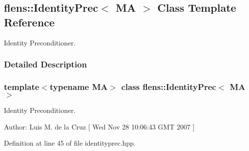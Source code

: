 \hypertarget{classflens_1_1IdentityPrec}{
\subsection{flens::IdentityPrec$<$ MA $>$ Class Template Reference}
\label{classflens_1_1IdentityPrec}
}
Identity Preconditioner.  




\subsubsection{Detailed Description}
\subsubsection*{template$<$typename MA$>$ class flens::IdentityPrec$<$ MA $>$}

Identity Preconditioner. 

\begin{Desc}
\item[Author:]Luis M. de la Cruz \mbox{[} Wed Nov 28 10:06:43 GMT 2007 \mbox{]} \end{Desc}


Definition at line 45 of file identityprec.hpp.